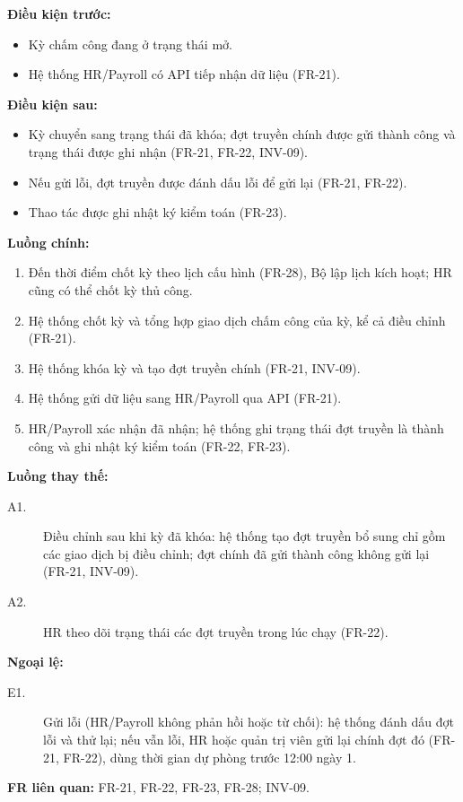 \noindent\textbf{Điều kiện trước:}
\begin{itemize}
    \item Kỳ chấm công đang ở trạng thái mở.
    \item Hệ thống HR/Payroll có API tiếp nhận dữ liệu (FR-21).
\end{itemize}

\noindent\textbf{Điều kiện sau:}
\begin{itemize}
    \item Kỳ chuyển sang trạng thái đã khóa; đợt truyền chính được gửi thành công và trạng thái được ghi nhận (FR-21, FR-22, INV-09).
    \item Nếu gửi lỗi, đợt truyền được đánh dấu lỗi để gửi lại (FR-21, FR-22).
    \item Thao tác được ghi nhật ký kiểm toán (FR-23).
\end{itemize}

\noindent\textbf{Luồng chính:}
\begin{enumerate}
    \item Đến thời điểm chốt kỳ theo lịch cấu hình (FR-28), Bộ lập lịch kích hoạt; HR cũng có thể chốt kỳ thủ công.
    \item Hệ thống chốt kỳ và tổng hợp giao dịch chấm công của kỳ, kể cả điều chỉnh (FR-21).
    \item Hệ thống khóa kỳ và tạo đợt truyền chính (FR-21, INV-09).
    \item Hệ thống gửi dữ liệu sang HR/Payroll qua API (FR-21).
    \item HR/Payroll xác nhận đã nhận; hệ thống ghi trạng thái đợt truyền là thành công và ghi nhật ký kiểm toán (FR-22, FR-23).
\end{enumerate}

\noindent\textbf{Luồng thay thế:}
\begin{description}
    \item[A1.] Điều chỉnh sau khi kỳ đã khóa: hệ thống tạo đợt truyền bổ sung chỉ gồm các giao dịch bị điều chỉnh; đợt chính đã gửi thành công không gửi lại (FR-21, INV-09).
    \item[A2.] HR theo dõi trạng thái các đợt truyền trong lúc chạy (FR-22).
\end{description}

\noindent\textbf{Ngoại lệ:}
\begin{description}
    \item[E1.] Gửi lỗi (HR/Payroll không phản hồi hoặc từ chối): hệ thống đánh dấu đợt lỗi và thử lại; nếu vẫn lỗi, HR hoặc quản trị viên gửi lại chính đợt đó (FR-21, FR-22), dùng thời gian dự phòng trước 12:00 ngày 1.
\end{description}

\noindent\textbf{FR liên quan:} FR-21, FR-22, FR-23, FR-28; INV-09.